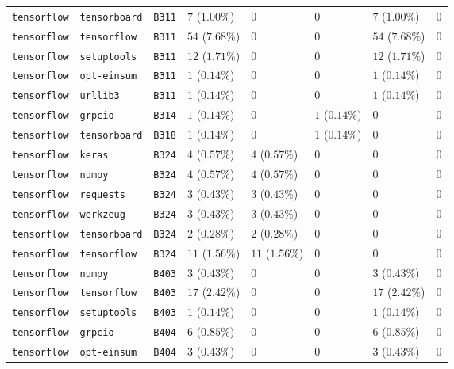 \begin{table}
\begin{tabular}{llllllll}
\texttt{tensorflow} & \texttt{tensorboard} & \texttt{B311} & $7$ ($1.00\%$) & $0$ & $0$ & $7$ ($1.00\%$) & $0$ \\
\texttt{tensorflow} & \texttt{tensorflow} & \texttt{B311} & $54$ ($7.68\%$) & $0$ & $0$ & $54$ ($7.68\%$) & $0$ \\
\texttt{tensorflow} & \texttt{setuptools} & \texttt{B311} & $12$ ($1.71\%$) & $0$ & $0$ & $12$ ($1.71\%$) & $0$ \\
\texttt{tensorflow} & \texttt{opt-einsum} & \texttt{B311} & $1$ ($0.14\%$) & $0$ & $0$ & $1$ ($0.14\%$) & $0$ \\
\texttt{tensorflow} & \texttt{urllib3} & \texttt{B311} & $1$ ($0.14\%$) & $0$ & $0$ & $1$ ($0.14\%$) & $0$ \\
\texttt{tensorflow} & \texttt{grpcio} & \texttt{B314} & $1$ ($0.14\%$) & $0$ & $1$ ($0.14\%$) & $0$ & $0$ \\
\texttt{tensorflow} & \texttt{tensorboard} & \texttt{B318} & $1$ ($0.14\%$) & $0$ & $1$ ($0.14\%$) & $0$ & $0$ \\
\texttt{tensorflow} & \texttt{keras} & \texttt{B324} & $4$ ($0.57\%$) & $4$ ($0.57\%$) & $0$ & $0$ & $0$ \\
\texttt{tensorflow} & \texttt{numpy} & \texttt{B324} & $4$ ($0.57\%$) & $4$ ($0.57\%$) & $0$ & $0$ & $0$ \\
\texttt{tensorflow} & \texttt{requests} & \texttt{B324} & $3$ ($0.43\%$) & $3$ ($0.43\%$) & $0$ & $0$ & $0$ \\
\texttt{tensorflow} & \texttt{werkzeug} & \texttt{B324} & $3$ ($0.43\%$) & $3$ ($0.43\%$) & $0$ & $0$ & $0$ \\
\texttt{tensorflow} & \texttt{tensorboard} & \texttt{B324} & $2$ ($0.28\%$) & $2$ ($0.28\%$) & $0$ & $0$ & $0$ \\
\texttt{tensorflow} & \texttt{tensorflow} & \texttt{B324} & $11$ ($1.56\%$) & $11$ ($1.56\%$) & $0$ & $0$ & $0$ \\
\texttt{tensorflow} & \texttt{numpy} & \texttt{B403} & $3$ ($0.43\%$) & $0$ & $0$ & $3$ ($0.43\%$) & $0$ \\
\texttt{tensorflow} & \texttt{tensorflow} & \texttt{B403} & $17$ ($2.42\%$) & $0$ & $0$ & $17$ ($2.42\%$) & $0$ \\
\texttt{tensorflow} & \texttt{setuptools} & \texttt{B403} & $1$ ($0.14\%$) & $0$ & $0$ & $1$ ($0.14\%$) & $0$ \\
\texttt{tensorflow} & \texttt{grpcio} & \texttt{B404} & $6$ ($0.85\%$) & $0$ & $0$ & $6$ ($0.85\%$) & $0$ \\
\texttt{tensorflow} & \texttt{opt-einsum} & \texttt{B404} & $3$ ($0.43\%$) & $0$ & $0$ & $3$ ($0.43\%$) & $0$ \\

\end{tabular}
\end{table}
